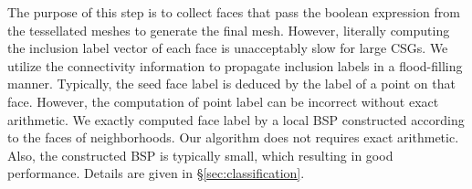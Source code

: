 The purpose of this step is to collect faces that pass the boolean expression from the tessellated meshes to generate the final mesh. However, literally computing the inclusion label vector of each face is unacceptably slow for large CSGs. We utilize the connectivity information to propagate inclusion labels in a flood-filling manner. Typically, the seed face label is deduced by the label of a point on that face. However, the computation of point label can be incorrect without exact arithmetic. We exactly computed face label by a local BSP constructed according to the faces of neighborhoods. Our algorithm does not requires exact arithmetic. Also, the constructed BSP is typically small, which resulting in good performance. Details are given in \S\ref{sec:classification}.
